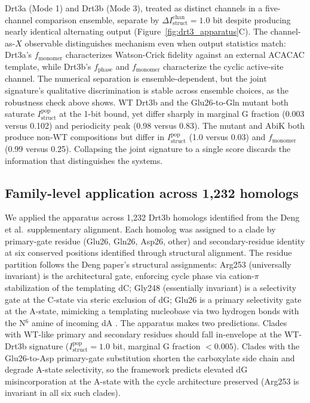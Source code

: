 \documentclass[aps,prx,reprint,amsmath,amssymb,floatfix,superscriptaddress,nofootinbib]{revtex4-2}
\theoremstyle{plain-thm}
\theoremstyle{definition-thm}
\newcommand{\Istructpop}{I_{\mathrm{struct}}^{\mathrm{pop}}}
\newcommand{\Istructchan}{I_{\mathrm{struct}}^{\mathrm{chan}}}
\newcommand{\fphase}{f_{\mathrm{phase}}}
\newcommand{\fmonomer}{f_{\mathrm{monomer}}}
\begin{document}
Drt3a (Mode 1) and Drt3b (Mode 3), treated as distinct channels in a five-channel comparison ensemble, separate by $\Delta\Istructchan = 1.0$ bit despite producing nearly identical alternating output (Figure~\ref{fig:drt3_apparatus}C). The channel-as-$X$ observable distinguishes mechanism even when output statistics match: Drt3a's $\fmonomer$ characterizes Watson-Crick fidelity against an external ACACAC template, while Drt3b's $\fphase$ and $\fmonomer$ characterize the cyclic active-site channel. The numerical separation is ensemble-dependent, but the joint signature's qualitative discrimination is stable across ensemble choices, as the robustness check above shows. WT Drt3b and the Glu26-to-Gln mutant both saturate $\Istructpop$ at the 1-bit bound, yet differ sharply in marginal G fraction (0.003 versus 0.102) and periodicity peak (0.98 versus 0.83). The mutant and AbiK both produce non-WT compositions but differ in $\Istructpop$ (1.0 versus 0.03) and $\fmonomer$ (0.99 versus 0.25). Collapsing the joint signature to a single score discards the information that distinguishes the systems.

\subsection{Family-level application across 1{,}232 homologs}

We applied the apparatus across 1{,}232 Drt3b homologs identified from the Deng et al.\ supplementary alignment. Each homolog was assigned to a clade by primary-gate residue (Glu26, Gln26, Asp26, other) and secondary-residue identity at six conserved positions identified through structural alignment. The residue partition follows the Deng paper's structural assignments: Arg253 (universally invariant) is the architectural gate, enforcing cycle phase via cation-$\pi$ stabilization of the templating dC; Gly248 (essentially invariant) is a selectivity gate at the C-state via steric exclusion of dG; Glu26 is a primary selectivity gate at the A-state, mimicking a templating nucleobase via two hydrogen bonds with the N$^6$ amine of incoming dA \citep{Deng2026}. The apparatus makes two predictions. Clades with WT-like primary and secondary residues should fall in-envelope at the WT-Drt3b signature ($\Istructpop = 1.0$ bit, marginal G fraction $< 0.005$). Clades with the Glu26-to-Asp primary-gate substitution shorten the carboxylate side chain and degrade A-state selectivity, so the framework predicts elevated dG misincorporation at the A-state with the cycle architecture preserved (Arg253 is invariant in all six such clades).
\end{document}
